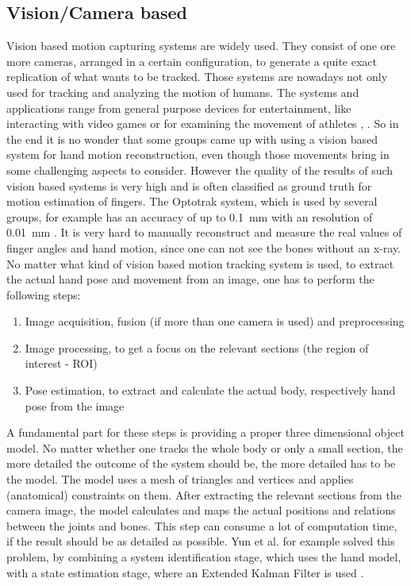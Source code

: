 \subsection{Vision/Camera based} \label{subsec:approaches:vision}
Vision based motion capturing systems are widely used. They consist of one ore more cameras, arranged in a certain configuration, to generate a quite exact replication of what wants to be tracked. Those systems are nowadays not only used for tracking and analyzing the motion of humans. The systems and applications range from general purpose devices for entertainment, like interacting with video games or for examining the movement of athletes \cite{zhang2012microsoft}, \cite{boyd2012situ}. So in the end it is no wonder that some groups came up with using a vision based system for hand motion reconstruction, even though those movements bring in some challenging aspects to consider. However the quality of the results of such vision based systems is very high and is often classified as ground truth for motion estimation of fingers. The Optotrak system, which is used by several groups, for example has an accuracy of up to \SI{0.1}{\mm} with an resolution of \SI{0.01}{\mm} \cite{optotrak}. It is very hard to manually reconstruct and measure the real values of finger angles and hand motion, since one can not see the bones without an x-ray. \\
No matter what kind of vision based motion tracking system is used, to extract the actual hand pose and movement from an image, one has to perform the following steps:
\begin{enumerate}
\item Image acquisition, fusion (if more than one camera is used) and preprocessing
\item Image processing, to get a focus on the relevant sections (the region of interest - ROI) 
\item Pose estimation, to extract and calculate the actual body, respectively hand pose from the image
\end{enumerate}
A fundamental part for these steps is providing a proper three dimensional object model. No matter whether one tracks the whole body or only a small section, the more detailed the outcome of the system should be, the more detailed has to be the model. The model uses a mesh of triangles and vertices and applies (anatomical) constraints on them. After extracting the relevant sections from the camera image, the model calculates and maps the actual positions and relations between the joints and bones. This step can consume a lot of computation time, if the result should be as detailed as possible. Yun et al. for example solved this problem, by combining a system identification stage, which uses the hand model, with a state estimation stage, where an Extended Kalman Filter is used \cite{yun2013accurate}.

